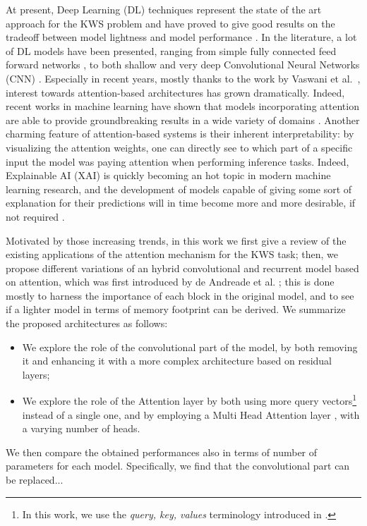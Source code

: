 At present, Deep Learning (DL) techniques represent the state of the art approach for the KWS problem and have proved to give good results on the tradeoff between model lightness and model performance \cite{dnns2014chen} \cite{convnns2015sainath} \cite{streamingkws2020Rybakov}. In the literature, a lot of DL models have been presented, ranging from simple fully connected feed forward networks \cite{dnns2014chen}, to both shallow and very deep Convolutional Neural Networks (CNN) \cite{deepreslearning2018tang} \cite{convnns2015sainath}
\cite{mittermaier2020small} \cite{choi2019temporal}. Especially in recent years, mostly thanks to the work by Vaswani et al.~\cite{attentionisall2017vaswani}, interest towards attention-based architectures has grown dramatically. Indeed, recent works in machine learning have shown that models incorporating attention are able to provide groundbreaking results in a wide variety of domains \cite{vit2020Dosovitskiy} \cite{touvron2021training} \cite{gulati2020conformer} \cite{kumar2021colorization} \cite{Devlin2019BERTPO}. Another charming feature of attention-based systems is their inherent interpretability: by visualizing the attention weights, one can directly see to which part of a specific input the model was paying attention when performing inference tasks. Indeed, Explainable AI (XAI) is quickly becoming an hot topic in modern machine learning research, and the development of models capable of giving some sort of explanation for their predictions  will in time become more and more desirable, if not required \cite{gdpr2017}.

Motivated by those increasing trends, in this work we first give a review of the existing applications of the attention mechanism for the KWS task; then, we propose different variations of an hybrid convolutional and recurrent model based on attention, which was first introduced by de Andreade et al. \cite{attention2018andreade}; this is done mostly to harness the importance of each block in the original model, and to see if a lighter model in terms of memory footprint can be derived. We summarize the proposed architectures as follows:
\begin{itemize}
	\item We explore the role of the convolutional part of the model, by both removing it and enhancing it with a more complex architecture based on residual layers;
	\item We explore the role of the Attention layer by both using more query vectors\footnote{In this work, we use the \textit{query, key, values} terminology introduced in \cite{attentionisall2017vaswani}.} instead of a single one, and by employing a Multi Head Attention layer \cite{attentionisall2017vaswani}, with a varying number of heads.
\end{itemize}
We then compare the obtained performances also in terms of number of parameters for each model. Specifically, we find that the convolutional part can be replaced... %


